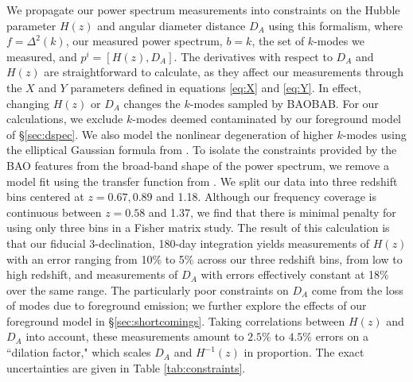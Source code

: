 \documentclass[10pt,iop]{emulateapj}
\begin{document}
We propagate our power spectrum measurements into constraints on the Hubble parameter $H(z)$
and angular diameter distance $D_A$
using this formalism, where $f = \Delta^2(k)$, our measured power spectrum, $b = k$, the set
of $k$-modes we measured, and $p^i = [H(z),D_A]$.
The derivatives with respect to $D_A$ and $H(z)$ are straightforward to calculate, as they affect
our measurements through the $X$ and $Y$ parameters defined in equations \ref{eq:X} and \ref{eq:Y}.
In effect, changing $H(z)$ or $D_A$ changes the $k$-modes sampled by BAOBAB.
For our calculations, we exclude $k$-modes deemed contaminated by our foreground
model of \S\ref{sec:dspec}.  We also model the nonlinear degeneration of higher $k$-modes
using the elliptical Gaussian formula from \citet{seo_and_eisenstein_2007}.
To isolate the constraints provided by the BAO features from the broad-band shape of the
power spectrum, we remove a model fit using the transfer function from
\citet{eisenstein_and_hu_1998}.  We split our data into three redshift bins centered at 
$z = 0.67,0.89$ and 1.18.  Although our frequency coverage is continuous between 
$z = 0.58$ and 1.37, we find that there is minimal penalty for using only three bins in a Fisher matrix
study.  The result of this calculation is that our fiducial 3-declination, 180-day 
integration yields measurements of 
$H(z)$ with an error ranging from 10\% to 5\% across our three redshift bins, from low to high redshift, and measurements of $D_A$ with errors effectively constant at 18\% over the same range.  
The particularly poor constraints on $D_A$ come from the loss of modes due to foreground emission;
we further explore the effects of our foreground model in \S\ref{sec:shortcomings}.
Taking
correlations between $H(z)$ and $D_A$ into account, these measurements amount to $2.5\%$ to $4.5\%$
errors on a ``dilation factor," which scales $D_A$ and $H^{-1}(z)$ in proportion.
The exact uncertainties are given in Table \ref{tab:constraints}.
\end{document}
